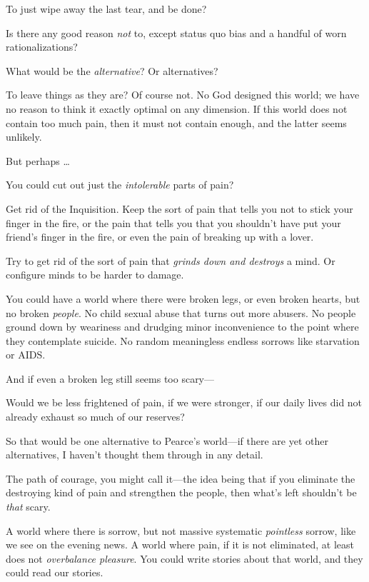 {
 To just wipe away the last tear, and be done?}

{
 Is there any good reason \textit{not} to, except status quo bias
and a handful of worn rationalizations?}

{
 What would be the \textit{alternative}? Or alternatives?}

{
 To leave things as they are? Of course not. No God designed this
world; we have no reason to think it exactly optimal on any dimension.
If this world does not contain too much pain, then it must not contain
enough, and the latter seems unlikely.}

{
 But perhaps \ldots}

{
 You could cut out just the \textit{intolerable} parts of pain?}

{
 Get rid of the Inquisition. Keep the sort of pain that tells you
not to stick your finger in the fire, or the pain that tells you that
you shouldn't have put your friend's
finger in the fire, or even the pain of breaking up with a lover.}

{
 Try to get rid of the sort of pain that \textit{grinds down and
destroys} a mind. Or configure minds to be harder to damage.}

{
 You could have a world where there were broken legs, or even
broken hearts, but no broken \textit{people}. No child sexual abuse
that turns out more abusers. No people ground down by weariness and
drudging minor inconvenience to the point where they contemplate
suicide. No random meaningless endless sorrows like starvation or
AIDS.}

{
 And if even a broken leg still seems too scary---}

{
 Would we be less frightened of pain, if we were stronger, if our
daily lives did not already exhaust so much of our reserves?}

{
 So that would be one alternative to Pearce's
world---if there are yet other alternatives, I haven't
thought them through in any detail.}

{
 The path of courage, you might call it---the idea being that if
you eliminate the destroying kind of pain and strengthen the people,
then what's left shouldn't be
\textit{that} scary.}

{
 A world where there is sorrow, but not massive systematic
\textit{pointless} sorrow, like we see on the evening news. A world
where pain, if it is not eliminated, at least does not
\textit{overbalance pleasure}. You could write stories about that
world, and they could read our stories.}

